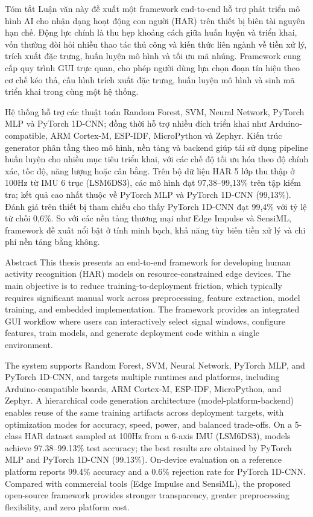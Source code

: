 \begin{preface}{Tóm tắt}
Luận văn này đề xuất một framework end-to-end hỗ trợ phát triển mô hình AI cho nhận dạng hoạt động con người (HAR) trên thiết bị biên tài nguyên hạn chế. Động lực chính là thu hẹp khoảng cách giữa huấn luyện và triển khai, vốn thường đòi hỏi nhiều thao tác thủ công và kiến thức liên ngành về tiền xử lý, trích xuất đặc trưng, huấn luyện mô hình và tối ưu mã nhúng. Framework cung cấp quy trình GUI trực quan, cho phép người dùng lựa chọn đoạn tín hiệu theo cơ chế kéo thả, cấu hình trích xuất đặc trưng, huấn luyện mô hình và sinh mã triển khai trong cùng một hệ thống.

Hệ thống hỗ trợ các thuật toán Random Forest, SVM, Neural Network, PyTorch MLP và PyTorch 1D-CNN; đồng thời hỗ trợ nhiều đích triển khai như Arduino-compatible, ARM Cortex-M, ESP-IDF, MicroPython và Zephyr. Kiến trúc generator phân tầng theo mô hình, nền tảng và backend giúp tái sử dụng pipeline huấn luyện cho nhiều mục tiêu triển khai, với các chế độ tối ưu hóa theo độ chính xác, tốc độ, năng lượng hoặc cân bằng. Trên bộ dữ liệu HAR 5 lớp thu thập ở 100Hz từ IMU 6 trục (LSM6DS3), các mô hình đạt 97,38--99,13\% trên tập kiểm tra; kết quả cao nhất thuộc về PyTorch MLP và PyTorch 1D-CNN (99,13\%). Đánh giá trên thiết bị tham chiếu cho thấy PyTorch 1D-CNN đạt 99,4\% với tỷ lệ từ chối 0,6\%. So với các nền tảng thương mại như Edge Impulse và SensiML, framework đề xuất nổi bật ở tính minh bạch, khả năng tùy biến tiền xử lý và chi phí nền tảng bằng không.
\end{preface}

\begin{preface}{Abstract}
This thesis presents an end-to-end framework for developing human activity recognition (HAR) models on resource-constrained edge devices. The main objective is to reduce training-to-deployment friction, which typically requires significant manual work across preprocessing, feature extraction, model training, and embedded implementation. The framework provides an integrated GUI workflow where users can interactively select signal windows, configure features, train models, and generate deployment code within a single environment.

The system supports Random Forest, SVM, Neural Network, PyTorch MLP, and PyTorch 1D-CNN, and targets multiple runtimes and platforms, including Arduino-compatible boards, ARM Cortex-M, ESP-IDF, MicroPython, and Zephyr. A hierarchical code generation architecture (model-platform-backend) enables reuse of the same training artifacts across deployment targets, with optimization modes for accuracy, speed, power, and balanced trade-offs. On a 5-class HAR dataset sampled at 100Hz from a 6-axis IMU (LSM6DS3), models achieve 97.38--99.13\% test accuracy; the best results are obtained by PyTorch MLP and PyTorch 1D-CNN (99.13\%). On-device evaluation on a reference platform reports 99.4\% accuracy and a 0.6\% rejection rate for PyTorch 1D-CNN. Compared with commercial tools (Edge Impulse and SensiML), the proposed open-source framework provides stronger transparency, greater preprocessing flexibility, and zero platform cost.
\end{preface}
